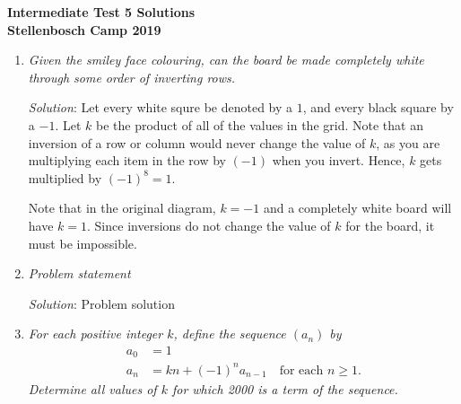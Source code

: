 \documentclass{article}
\begin{document}
\begin{center}
  \textbf{\Large Intermediate Test 5 Solutions}
  \\ \vspace{1em}
  \textbf{\large Stellenbosch Camp 2019}
\end{center}


\begin{enumerate}[1.]

	\item %
	\textit{Given the smiley face colouring, can the board be made completely white through some order of inverting rows.
	}
	
	\textit{Solution}:
	Let every white squre be denoted by a $1$, and every black square by a $-1$. Let $k$ be the product of all of the values in the grid. 
	Note that an inversion of a row or column would never change the value of $k$, as you are multiplying each item in the row by $(-1)$ when you invert. Hence, $k$ gets multiplied by $(-1)^8 = 1$.
	
	Note that in the original diagram, $k = -1$ and a completely white board will have $k = 1$. Since inversions do not change the value of $k$ for the board, it must be impossible.
	
\item %
\textit{Problem statement}

\textit{Solution}: Problem solution

\item %
\textit{For each positive integer $k$, define the sequence $(a_{n})$ by
	\begin{align*}
	a_{0} &= 1 \\
	a_{n} &= kn + (-1)^{n}a_{n-1} \quad \text{for each } n \geq 1.
	\end{align*}
	Determine all values of $k$ for which 2000 is a term of the sequence.}


\end{enumerate}
\end{document}
